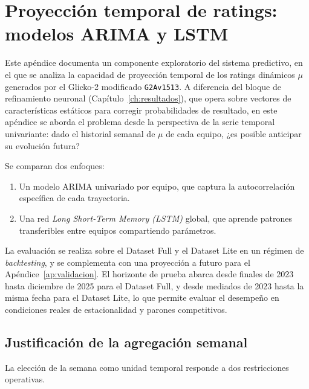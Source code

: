 \chapter{Proyecci\'on temporal de ratings: modelos ARIMA y LSTM}
\label{ap:proyeccion_temporal}

Este ap\'endice documenta un componente exploratorio del sistema predictivo, en el que se analiza la capacidad de proyecci\'on temporal de los ratings din\'amicos \(\mu\) generados por el Glicko-2 modificado \texttt{G2Av1513}. A diferencia del bloque de refinamiento neuronal (Cap\'itulo~\ref{ch:resultados}), que opera sobre vectores de caracter\'isticas est\'aticos para corregir probabilidades de resultado, en este ap\'endice se aborda el problema desde la perspectiva de la serie temporal univariante: dado el historial semanal de \(\mu\) de cada equipo, ¿es posible anticipar su evoluci\'on futura?

Se comparan dos enfoques: 

\begin{enumerate}
	\item Un modelo ARIMA univariado por equipo, que captura la autocorrelaci\'on espec\'ifica de cada trayectoria.
	\item Una red \textit{Long Short-Term Memory (LSTM)} global, que aprende patrones transferibles entre equipos compartiendo par\'ametros.
\end{enumerate}

La evaluaci\'on se realiza sobre el Dataset Full y el Dataset Lite en un r\'egimen de \textit{backtesting}, y se complementa con una proyecci\'on a futuro para el Ap\'endice~\ref{ap:validacion}. El horizonte de prueba abarca desde finales de 2023 hasta diciembre de 2025 para el Dataset Full, y desde mediados de 2023 hasta la misma fecha para el Dataset Lite, lo que permite evaluar el desempe\~no en condiciones reales de estacionalidad y parones competitivos.

\section{Justificaci\'on de la agregaci\'on semanal}
\label{ap:justificacion_semanal}

La elecci\'on de la semana como unidad temporal responde a dos restricciones operativas. 


